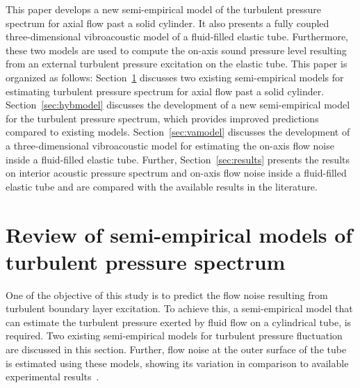 \documentclass[11pt,cleanfoot]{asme2ej}
\begin{document}
This paper develops a new semi-empirical model of the turbulent pressure spectrum for axial flow past a solid cylinder. It also presents a fully coupled three-dimensional vibroacoustic model of a fluid-filled elastic tube. Furthermore, these two models are used to compute the on-axis sound pressure level resulting from an external turbulent pressure excitation on the elastic tube. This paper is organized as follows: Section~\ref{sec:empmodels} discusses two existing semi-empirical models for estimating turbulent pressure spectrum for axial flow past a solid cylinder. Section~\ref{sec:hybmodel} discusses the development of a new semi-empirical model for the turbulent pressure spectrum, which provides improved predictions compared to existing models. Section~\ref{sec:vamodel} discusses the development of a three-dimensional vibroacoustic model for estimating the on-axis flow noise inside a fluid-filled elastic tube. Further, Section~\ref{sec:results} presents the results on interior acoustic pressure spectrum and on-axis flow noise inside a fluid-filled elastic tube and are compared with the available results in the literature.
\section{Review of semi-empirical models of turbulent pressure spectrum} \label{sec:empmodels}

One of the objective of this study is to predict the flow noise resulting from turbulent boundary layer excitation. To achieve this, a semi-empirical model that can estimate the turbulent pressure exerted by fluid flow on a cylindrical tube, is required. Two existing semi-empirical models for turbulent pressure fluctuation are discussed in this section. Further, flow noise at the outer surface of the tube is estimated using these models, showing its variation in comparison to available experimental results~\cite{Unni2011}. 
\end{document}
